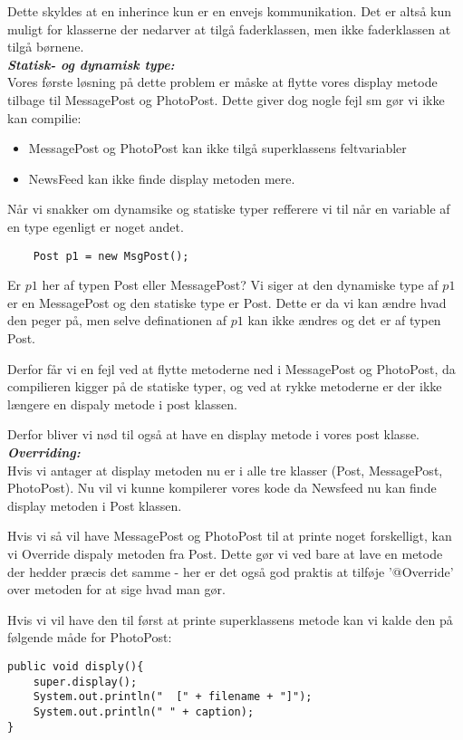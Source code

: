 \documentclass[a4paper,12pt]{article}
\newcommand{\textbfit}[1]{\textbf{\textit{#1}}}
\begin{document}
Dette skyldes at en inherince kun er en envejs kommunikation. Det er altså kun muligt for klasserne der nedarver at tilgå faderklassen, men ikke faderklassen at tilgå børnene. \\


\textbfit{Statisk- og dynamisk type:} \\
Vores første løsning på dette problem er måske at flytte vores display metode tilbage til MessagePost og PhotoPost. Dette giver dog nogle fejl sm gør vi ikke kan compilie:
\begin{itemize}
    \item MessagePost og PhotoPost kan ikke tilgå superklassens feltvariabler
    \item NewsFeed kan ikke finde display metoden mere.
\end{itemize}

Når vi snakker om dynamsike og statiske typer refferere vi til når en variable af en type egenligt er noget andet.
\begin{verbatim}
    Post p1 = new MsgPost();
\end{verbatim}
Er $p1$ her af typen Post eller MessagePost? Vi siger at den dynamiske type af $p1$ er en MessagePost og den statiske type er Post. Dette er da vi kan ændre hvad den peger på, men selve definationen af $p1$ kan ikke ændres og det er af typen Post.

Derfor får vi en fejl ved at flytte metoderne ned i MessagePost og PhotoPost, da compilieren kigger på de statiske typer, og ved at rykke metoderne er der ikke længere en dispaly metode i post klassen.

Derfor bliver vi nød til også at have en display metode i vores post klasse. \\


\textbfit{Overriding:}\\
Hvis vi antager at display metoden nu er i alle tre klasser (Post, MessagePost, PhotoPost). Nu vil vi kunne kompilerer vores kode da Newsfeed nu kan finde display metoden i Post klassen.

Hvis vi så vil have MessagePost og PhotoPost til at printe noget forskelligt, kan vi Override dispaly metoden fra Post. Dette gør vi ved bare at lave en metode der hedder præcis det samme - her er det også god praktis at tilføje '@Override' over metoden for at sige hvad man gør.

Hvis vi vil have den til først at printe superklassens metode kan vi kalde den på følgende måde for PhotoPost:
\begin{verbatim}
public void disply(){
    super.display();
    System.out.println("  [" + filename + "]");
    System.out.println(" " + caption);
}
\end{verbatim}  
\end{document}
